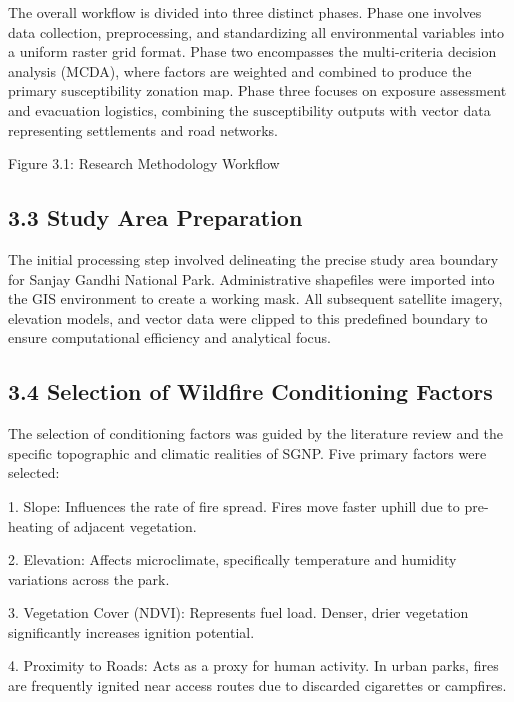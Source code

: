 \documentclass[12pt,a4paper]{article}
\begin{document}
The overall workflow is divided into three distinct phases. Phase one involves data collection, preprocessing, and standardizing all environmental variables into a uniform raster grid format. Phase two encompasses the multi-criteria decision analysis (MCDA), where factors are weighted and combined to produce the primary susceptibility zonation map. Phase three focuses on exposure assessment and evacuation logistics, combining the susceptibility outputs with vector data representing settlements and road networks.


Figure 3.1: Research Methodology Workflow



\subsection*{3.3 Study Area Preparation}

The initial processing step involved delineating the precise study area boundary for Sanjay Gandhi National Park. Administrative shapefiles were imported into the GIS environment to create a working mask. All subsequent satellite imagery, elevation models, and vector data were clipped to this predefined boundary to ensure computational efficiency and analytical focus.



\subsection*{3.4 Selection of Wildfire Conditioning Factors}

The selection of conditioning factors was guided by the literature review and the specific topographic and climatic realities of SGNP. Five primary factors were selected:


1. Slope: Influences the rate of fire spread. Fires move faster uphill due to pre-heating of adjacent vegetation.


2. Elevation: Affects microclimate, specifically temperature and humidity variations across the park.


3. Vegetation Cover (NDVI): Represents fuel load. Denser, drier vegetation significantly increases ignition potential.


4. Proximity to Roads: Acts as a proxy for human activity. In urban parks, fires are frequently ignited near access routes due to discarded cigarettes or campfires.
\end{document}

